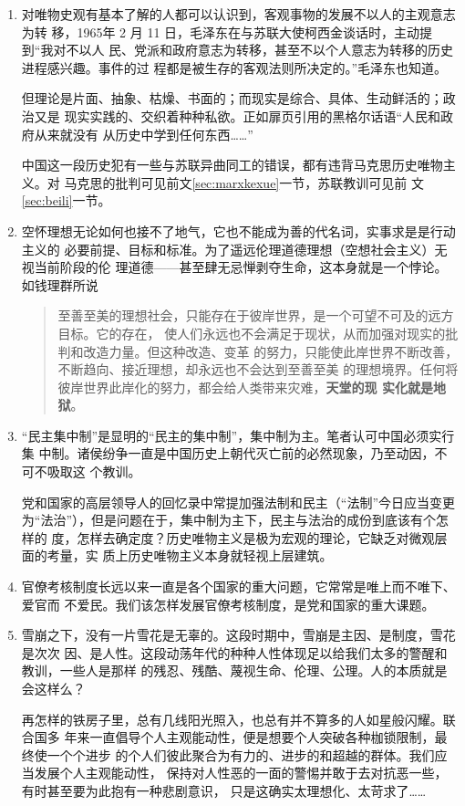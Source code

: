 \begin{enumerate}
\item 对唯物史观有基本了解的人都可以认识到，客观事物的发展不以人的主观意志为转
  移，1965年 2 月 11 日，毛泽东在与苏联大使柯西金谈话时，主动提到“我对不以人
  民、党派和政府意志为转移，甚至不以个人意志为转移的历史进程感兴趣。事件的过
  程都是被生存的客观法则所决定的。”毛泽东也知道。

  但理论是片面、抽象、枯燥、书面的；而现实是综合、具体、生动鲜活的；政治又是
  现实实践的、交织着种种私欲。正如扉页引用的黑格尔话语“人民和政府从来就没有
  从历史中学到任何东西……”

  中国这一段历史犯有一些与苏联异曲同工的错误，都有违背马克思历史唯物主义。对
  马克思的批判可见前文\cref{sec:marxkexue}一节，苏联教训可见前
  文\cref{sec:beili}一节。

\item 空怀理想无论如何也接不了地气，它也不能成为善的代名词，实事求是是行动主义的
  必要前提、目标和标准。为了遥远伦理道德理想（空想社会主义）无视当前阶段的伦
  理道德——甚至肆无忌惮剥夺生命，这本身就是一个悖论。如钱理群所说
  \begin{quotation}
    至善至美的理想社会，只能存在于彼岸世界，是一个可望不可及的远方目标。它的存在，
    使人们永远也不会满足于现状，从而加强对现实的批判和改造力量。但这种改造、变革
    的努力，只能使此岸世界不断改善，不断趋向、接近理想，却永远也不会达到至善至美
    的理想境界。任何将彼岸世界此岸化的努力，都会给人类带来灾难，\textbf{天堂的现
      实化就是地狱}。
  \end{quotation}

\item “民主集中制”是显明的“民主的集中制”，集中制为主。笔者认可中国必须实行集
  中制。诸侯纷争一直是中国历史上朝代灭亡前的必然现象，乃至动因，不可不吸取这
  个教训。

  党和国家的高层领导人的回忆录中常提加强法制和民主（“法制”今日应当变更
  为“法治”），但是问题在于，集中制为主下，民主与法治的成份到底该有个怎样的
  度，怎样去确定度？历史唯物主义是极为宏观的理论，它缺乏对微观层面的考量，实
  质上历史唯物主义本身就轻视上层建筑。

\item 官僚考核制度长远以来一直是各个国家的重大问题，它常常是唯上而不唯下、爱官而
  不爱民。我们该怎样发展官僚考核制度，是党和国家的重大课题。

\item 雪崩之下，没有一片雪花是无辜的。这段时期中，雪崩是主因、是制度，雪花是次次
  因、是人性。这段动荡年代的种种人性体现足以给我们太多的警醒和教训，一些人是那样
  的残忍、残酷、蔑视生命、伦理、公理。人的本质就是会这样么？

  再怎样的铁房子里，总有几线阳光照入，也总有并不算多的人如星般闪耀。联合国多
  年来一直倡导个人主观能动性，便是想要个人突破各种枷锁限制，最终使一个个进步
  的个人们彼此聚合为有力的、进步的和超越的群体。我们应当发展个人主观能动性，
  保持对人性恶的一面的警惕并敢于去对抗恶一些，有时甚至要为此抱有一种悲剧意识，
  只是这确实太理想化、太苛求了……
\end{enumerate}

